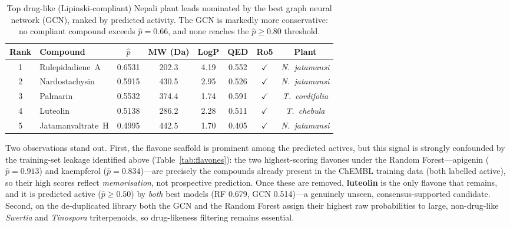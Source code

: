 \begin{table}[H]
\small
\centering
\caption{Top drug-like (Lipinski-compliant) Nepali plant leads nominated by the best
         graph neural network (GCN), ranked by predicted activity. The GCN is
         markedly more conservative: no compliant compound exceeds $\hat{p} = 0.66$,
         and none reaches the $\hat{p} \geq 0.80$ threshold.}
\label{tab:leads_gcn}
{\singlespacing
\begin{tabular}{clcccccc}
\toprule
\textbf{Rank} & \textbf{Compound} & \textbf{$\hat{p}$}
              & \textbf{MW (Da)} & \textbf{LogP} & \textbf{QED}
              & \textbf{Ro5} & \textbf{Plant} \\
\midrule
1 & Rulepidadiene~A   & 0.6531 & 202.3 & 4.19 & 0.552 & $\checkmark$ & \textit{N.~jatamansi}  \\
2 & Nardostachysin    & 0.5915 & 430.5 & 2.95 & 0.526 & $\checkmark$ & \textit{N.~jatamansi}  \\
3 & Palmarin          & 0.5532 & 374.4 & 1.74 & 0.591 & $\checkmark$ & \textit{T.~cordifolia} \\
4 & Luteolin          & 0.5138 & 286.2 & 2.28 & 0.511 & $\checkmark$ & \textit{T.~chebula}    \\
5 & Jatamanvaltrate~H & 0.4995 & 442.5 & 1.70 & 0.405 & $\checkmark$ & \textit{N.~jatamansi}  \\
\bottomrule
\end{tabular}
}
\end{table}

Two observations stand out. First, the flavone scaffold is prominent among the
predicted actives, but this signal is strongly confounded by the training-set leakage
identified above (Table~\ref{tab:flavones}): the two highest-scoring flavones under the
Random Forest---apigenin ($\hat{p} = 0.913$) and kaempferol ($\hat{p} = 0.834$)---are
precisely the compounds already present in the ChEMBL training data (both labelled
active), so their high scores reflect \emph{memorisation}, not prospective prediction.
Once these are removed, \textbf{luteolin} is the only flavone that remains, and it is
predicted active ($\hat{p} \geq 0.50$) by \emph{both} best models (RF 0.679, GCN
0.514)---a genuinely unseen, consensus-supported candidate. Second, on the
de-duplicated library both the GCN and the Random Forest assign their highest raw
probabilities to large, non-drug-like \textit{Swertia} and \textit{Tinospora}
triterpenoids, so drug-likeness filtering remains essential.

